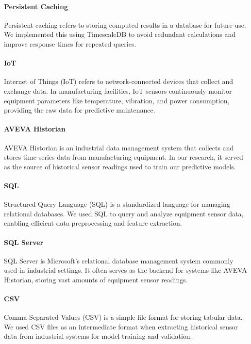 \paragraph{Persistent Caching} Persistent caching refers to storing computed results in a database for future use. We implemented this using TimescaleDB to avoid redundant calculations and improve response times for repeated queries.

\paragraph{IoT} Internet of Things (IoT) refers to network-connected devices that collect and exchange data. In manufacturing facilities, IoT sensors continuously monitor equipment parameters like temperature, vibration, and power consumption, providing the raw data for predictive maintenance.

\paragraph{AVEVA Historian} AVEVA Historian is an industrial data management system that collects and stores time-series data from manufacturing equipment. In our research, it served as the source of historical sensor readings used to train our predictive models.

\paragraph{SQL} Structured Query Language (SQL) is a standardized language for managing relational databases. We used SQL to query and analyze equipment sensor data, enabling efficient data preprocessing and feature extraction.

\paragraph{SQL Server} SQL Server is Microsoft's relational database management system commonly used in industrial settings. It often serves as the backend for systems like AVEVA Historian, storing vast amounts of equipment sensor readings.

\paragraph{CSV} Comma-Separated Values (CSV) is a simple file format for storing tabular data. We used CSV files as an intermediate format when extracting historical sensor data from industrial systems for model training and validation.

